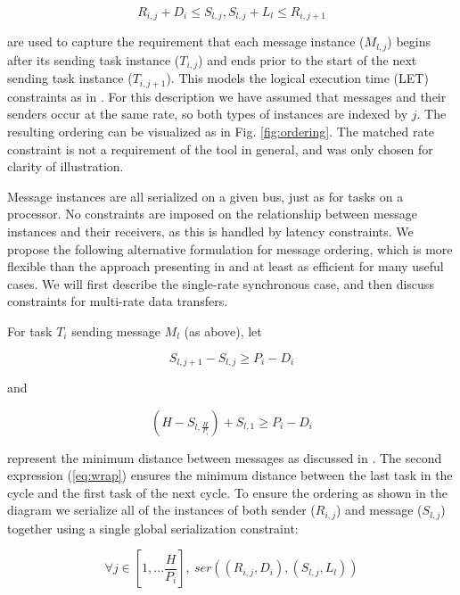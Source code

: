 \begin{equation}
R_{i,j}  + D_i  \leqslant S_{l,j}, S_{l,j}  + L_l  \leqslant R_{i,j+1}
\end{equation} 

are used to capture the requirement that each message instance ($M_{l,j}$) begins after its sending task 
instance ($T_{i,j}$) and ends prior to the start of the next sending task instance ($T_{i,j+1}$).  This 
models the logical execution time (LET) constraints as in \cite{modeling:giotto3,timed:let,timed:tdl}. 
For this description we have assumed that messages and their senders occur at the same rate, so both 
types of instances are indexed by $j$.  The resulting ordering can be visualized as in 
Fig. \ref{fig:ordering}.  The matched rate constraint is not a requirement of the tool in general, and 
was only chosen for clarity of illustration.

Message instances are all serialized on a given bus, just as for tasks on a processor.  No constraints 
are imposed on the relationship between message instances and their receivers, as this is handled by 
latency constraints. We propose the following alternative formulation for message ordering, which is more 
flexible than the approach presenting in \cite{sched:offline} and at least as efficient for many useful 
cases. We will first describe the single-rate synchronous case, and then discuss constraints for 
multi-rate data transfers.

For task $T_i$ sending message $M_l$ (as above), let 

\begin{equation}
\label{eq:msgord}
S_{l,j + 1}  - S_{l,j}  \geqslant P_i  - D_i 
\end{equation}

and

\begin{equation}
\label{eq:wrap}
(H - S_{l,\frac{H}
{{P_i }}} ) + S_{l,1}  \geqslant P_i  - D_i 
\end{equation}

represent the minimum distance between messages as discussed in \cite{sched:constr}.  The second 
expression (\ref{eq:wrap}) ensures the minimum distance between the last task in the cycle and the first 
task of the next cycle.
	To ensure the ordering as shown in the diagram we serialize all of the instances of both 
sender ($R_{i,j}$) and message ($S_{l,j}$) together using a single global serialization constraint:

\begin{equation}
\forall j \in [1,...\frac{H}{{P_i }}],\ ser((R_{i,j} ,D_i ),(S_{l,j} ,L_l ))
\end{equation}

